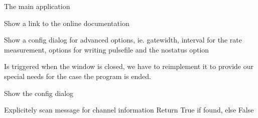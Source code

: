 \documentclass[letterpaper,10pt,english]{sphinxmanual}
\begin{document}
\begin{fulllineitems}
\label{muonic:muonic.gui.MainWindow.MainWindow}
The main application

\begin{fulllineitems}
\label{muonic:muonic.gui.MainWindow.MainWindow.about_menu}
Show a link to the online documentation

\end{fulllineitems}


\begin{fulllineitems}
\label{muonic:muonic.gui.MainWindow.MainWindow.advanced_menu}
Show a config dialog for advanced options, ie. gatewidth, interval for the rate measurement, options for writing pulsefile and the nostatus option

\end{fulllineitems}


\begin{fulllineitems}
\label{muonic:muonic.gui.MainWindow.MainWindow.closeEvent}
Is triggered when the window is closed, we have to reimplement it
to provide our special needs for the case the program is ended.

\end{fulllineitems}


\begin{fulllineitems}
\label{muonic:muonic.gui.MainWindow.MainWindow.config_menu}
Show the config dialog

\end{fulllineitems}


\begin{fulllineitems}
\label{muonic:muonic.gui.MainWindow.MainWindow.get_channels_from_queue}
Explicitely scan message for channel information
Return True if found, else False


\end{fulllineitems}
\end{fulllineitems}
\end{document}
